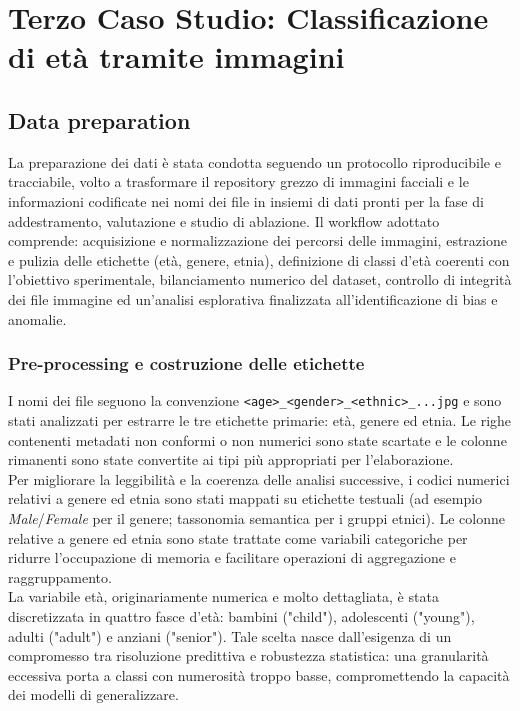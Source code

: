 \documentclass[a4paper,12pt]{report}
\begin{document}
	\chapter{Terzo Caso Studio: Classificazione di età tramite immagini}
	
	\section{Data preparation}
	
	La preparazione dei dati è stata condotta seguendo un protocollo riproducibile e tracciabile, volto a trasformare il repository grezzo di immagini facciali e le informazioni codificate nei nomi dei file in insiemi di dati pronti per la fase di addestramento, valutazione e studio di ablazione. Il workflow adottato comprende: acquisizione e normalizzazione dei percorsi delle immagini, estrazione e pulizia delle etichette (età, genere, etnia), definizione di classi d'età coerenti con l'obiettivo sperimentale, bilanciamento numerico del dataset, controllo di integrità dei file immagine ed un'analisi esplorativa finalizzata all'identificazione di bias e anomalie.
	
	\subsection{Pre-processing e costruzione delle etichette}
	
	I nomi dei file seguono la convenzione \texttt{<age>\_<gender>\_<ethnic>\_...jpg} e sono stati analizzati per estrarre le tre etichette primarie: età, genere ed etnia. Le righe contenenti metadati non conformi o non numerici sono state scartate e le colonne rimanenti sono state convertite ai tipi più appropriati per l'elaborazione. \\
	Per migliorare la leggibilità e la coerenza delle analisi successive, i codici numerici relativi a genere ed etnia sono stati mappati su etichette testuali (ad esempio \textit{Male}/\textit{Female} per il genere; tassonomia semantica per i gruppi etnici). Le colonne relative a genere ed etnia sono state trattate come variabili categoriche per ridurre l'occupazione di memoria e facilitare operazioni di aggregazione e raggruppamento. \\
	La variabile età, originariamente numerica e molto dettagliata, è stata discretizzata in quattro fasce d'età: bambini ("child"), adolescenti ("young"), adulti ("adult") e anziani ("senior"). Tale scelta nasce dall'esigenza di un compromesso tra risoluzione predittiva e robustezza statistica: una granularità eccessiva porta a classi con numerosità troppo basse, compromettendo la capacità dei modelli di generalizzare.
	
\end{document}
